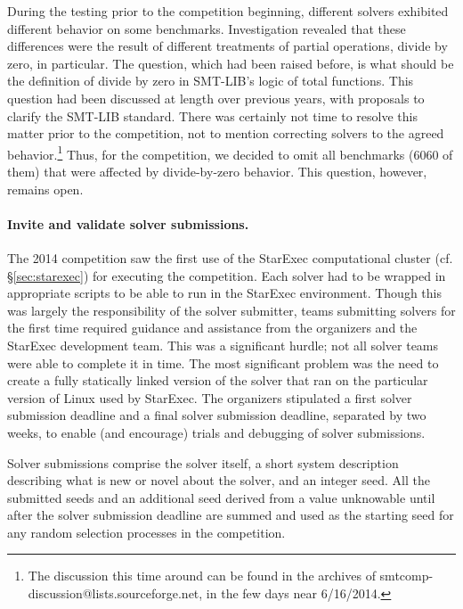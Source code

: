 \documentclass[twoside,11pt]{article}
\begin{document}
During the testing prior to the competition beginning, different solvers exhibited different behavior on some benchmarks. Investigation revealed that these differences were the result of different treatments of partial operations, divide by zero, in particular. The question, which had been raised before, is what should be the definition of divide by zero in SMT-LIB's logic of total functions. This question had been discussed at length over previous years, with proposals to clarify the SMT-LIB standard.
There was certainly not time to resolve this matter prior to the competition, not to mention correcting solvers to the agreed behavior.\footnote{The discussion this time around can be found in the archives of smtcomp-discussion@lists.sourceforge.net, in the few days near 6/16/2014.}
Thus, for the competition, we decided to omit all benchmarks (6060 of them) that were affected by divide-by-zero behavior. This question, however, remains open.

\paragraph{Invite and validate solver submissions.} The 2014 competition saw the first use of the StarExec computational cluster (cf. \S\ref{sec:starexec}) for executing the competition. Each solver had to be wrapped in appropriate scripts to be able to run in the StarExec environment. Though this was largely the responsibility of the solver submitter, teams submitting solvers for the first time required guidance and assistance from the organizers and the StarExec development team. This was a significant hurdle; not all solver teams were able to complete it in time. The most significant problem was the need to create a fully statically linked version of the solver that ran on the particular version of Linux used by StarExec. The organizers stipulated a first solver submission deadline and a final solver submission deadline, separated by two weeks, to enable (and encourage) trials and debugging of solver submissions.

Solver submissions comprise the solver itself, a short system description describing what is new or novel about the solver, and an integer seed. All the submitted seeds and an additional seed derived from a value unknowable until after the solver submission deadline are summed and used as the starting seed for any random selection processes in the competition.
\end{document}
